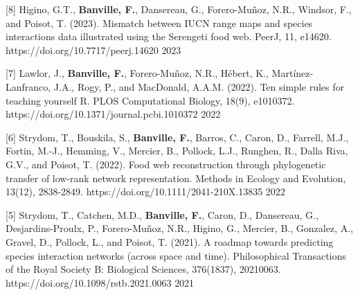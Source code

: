 

\begin{cventries}

  \cventry
    {[8] Higino, G.T., \textbf{Banville, F.}, Dansereau, G., Forero-Muñoz, N.R., Windsor, F., and Poisot, T. (2023). Mismatch between IUCN range maps and species interactions data illustrated using the Serengeti food web. PeerJ, 11, e14620. https://doi.org/10.7717/peerj.14620} %
    {} {} {2023} 
    {
      \begin{cvitems} %
      \end{cvitems}
    }

  \cventry
    {[7] Lawlor, J., \textbf{Banville, F.}, Forero-Muñoz, N.R., Hébert, K., Martínez-Lanfranco, J.A., Rogy, P., and MacDonald, A.A.M. (2022). Ten simple rules for teaching yourself R. PLOS Computational Biology, 18(9), e1010372. https://doi.org/10.1371/journal.pcbi.1010372} %
    {} {} {2022} 
    {
      \begin{cvitems} %
      \end{cvitems}
    }
    
  \cventry
    {[6] Strydom, T., Bouskila, S., \textbf{Banville, F.}, Barros, C., Caron, D., Farrell, M.J., Fortin, M.-J., Hemming, V., Mercier, B., Pollock, L.J., Runghen, R., Dalla Riva, G.V., and Poisot, T. (2022). Food web reconstruction through phylogenetic transfer of low-rank network representation. Methods in Ecology and Evolution, 13(12), 2838‑2849. https://doi.org/10.1111/2041-210X.13835} %
    {} {} {2022} 
    {
      \begin{cvitems} %
      \end{cvitems}
    }
    
  \cventry
    {[5] Strydom, T., Catchen, M.D., \textbf{Banville, F.}, Caron, D., Dansereau, G., Desjardins-Proulx, P., Forero-Muñoz, N.R., Higino, G., Mercier, B., Gonzalez, A., Gravel, D., Pollock, L., and Poisot, T. (2021). A roadmap towards predicting species interaction networks (across space and time). Philosophical Transactions of the Royal Society B: Biological Sciences, 376(1837), 20210063. https://doi.org/10.1098/rstb.2021.0063} %
    {} {} {2021} 
    {
      \begin{cvitems} %
      \end{cvitems}
    }
    

\end{cventries}
